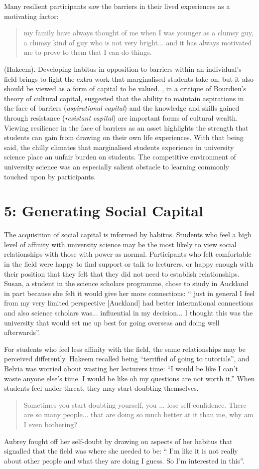 Many resilient participants saw the barriers in their lived experiences as a motivating factor: 
\blockquote{my family have always thought of me when I was younger as a clumsy guy, a clumsy kind of guy who is not very bright... and it has always motivated me to prove to them that I can do things.} (Hakeem).  Developing habitus in opposition to barriers within an individual's field brings to light the extra work that marginalised students take on, but it also should be viewed as a form of capital to be valued. \cite{yosso2005whose}, in a critique of Bourdieu's theory of cultural capital, suggested that the ability to maintain aspirations in the face of barriers (\textit{aspirational capital}) and the knowledge and skills gained through resistance (\textit{resistant capital}) are important forms of cultural wealth. Viewing resilience in the face of barriers as an asset highlights the strength that students can gain from drawing on their own life experiences. With that being said, the chilly climates \citep{Blickenstaff_2005} that marginalised students experience in university science place an unfair burden on students. The competitive environment of university science was an especially salient obstacle to learning commonly touched upon by participants.



\section{5: Generating Social Capital}
The acquisition of social capital is informed by habitus. Students who feel a high level of affinity with university science may be the most likely to view social relationships with those with power as normal. Participants who felt comfortable in the field were happy to find support or talk to lecturers, or happy enough with their position that they felt that they did not need to establish relationships. Susan, a student in the science scholars programme, chose to study in Auckland in part because she felt it would give her more connections: `` just in general I feel from my very limited perspective [Auckland] had better international connections and also science scholars was... influential in my decision... I thought this was the university that would set me up best for going overseas and doing well afterwards''.


For students who feel less affinity with the field, the same relationships may be perceived differently. Hakeem recalled being ``terrified of going to tutorials'', and Belvia was worried about wasting her lecturers time: ``I would be like I can’t waste anyone else’s time. I would be like oh my questions are not worth it.'' When students feel under threat, they may start doubting themselves. \blockquote{Sometimes you start doubting yourself, you ... lose self-confidence. There are so many people... that are doing so much better at it than me, why am I even bothering?} Aubrey fought off her self-doubt by drawing on aspects of her habitus that signalled that the field was where she needed to be: `` I'm like it is not really about other people and what they are doing I guess. So I’m interested in this''.


